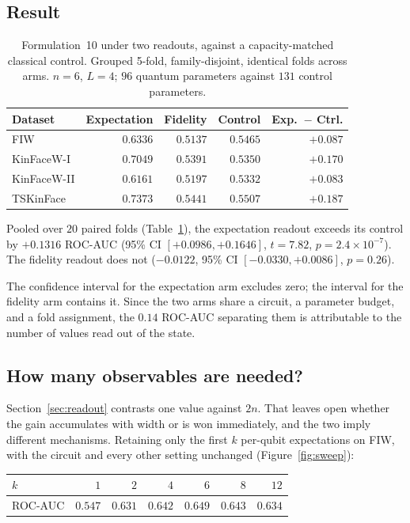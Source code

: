 \documentclass[preprint,12pt]{elsarticle}
\begin{document}
\subsection{Result}

\begin{table}[t]
\centering
\caption{Formulation~10 under two readouts, against a capacity-matched
classical control. Grouped 5-fold, family-disjoint, identical folds across
arms. $n=6$, $L=4$; $96$ quantum parameters against $131$ control parameters.}
\label{tab:readout}
\begin{tabular}{lrrrr}
\toprule
Dataset & Expectation & Fidelity & Control & Exp.\ $-$ Ctrl. \\
\midrule
FIW          & $0.6336$ & $0.5137$ & $0.5465$ & $+0.087$ \\
KinFaceW-I   & $0.7049$ & $0.5391$ & $0.5350$ & $+0.170$ \\
KinFaceW-II  & $0.6161$ & $0.5197$ & $0.5332$ & $+0.083$ \\
TSKinFace    & $0.7373$ & $0.5441$ & $0.5507$ & $+0.187$ \\
\bottomrule
\end{tabular}
\end{table}

Pooled over $20$ paired folds (Table~\ref{tab:readout}), the expectation
readout exceeds its control by $+0.1316$ ROC-AUC
(95\% CI $[+0.0986, +0.1646]$, $t = 7.82$, $p = 2.4 \times 10^{-7}$).
The fidelity readout does not
($-0.0122$, 95\% CI $[-0.0330, +0.0086]$, $p = 0.26$).

The confidence interval for the expectation arm excludes zero; the interval
for the fidelity arm contains it. Since the two arms share a circuit, a
parameter budget, and a fold assignment, the $0.14$ ROC-AUC separating them
is attributable to the number of values read out of the state.

\subsection{How many observables are needed?}
\label{sec:sweep}

Section~\ref{sec:readout} contrasts one value against $2n$. That leaves
open whether the gain accumulates with width or is won immediately, and the
two imply different mechanisms. Retaining only the first $k$ per-qubit
expectations on FIW, with the circuit and every other setting unchanged
(Figure~\ref{fig:sweep}):

\begin{center}
\begin{tabular}{lrrrrrr}
\toprule
$k$ & $1$ & $2$ & $4$ & $6$ & $8$ & $12$ \\
\midrule
ROC-AUC & $0.547$ & $0.631$ & $0.642$ & $0.649$ & $0.643$ & $0.634$ \\
\bottomrule
\end{tabular}
\end{center}
\end{document}
